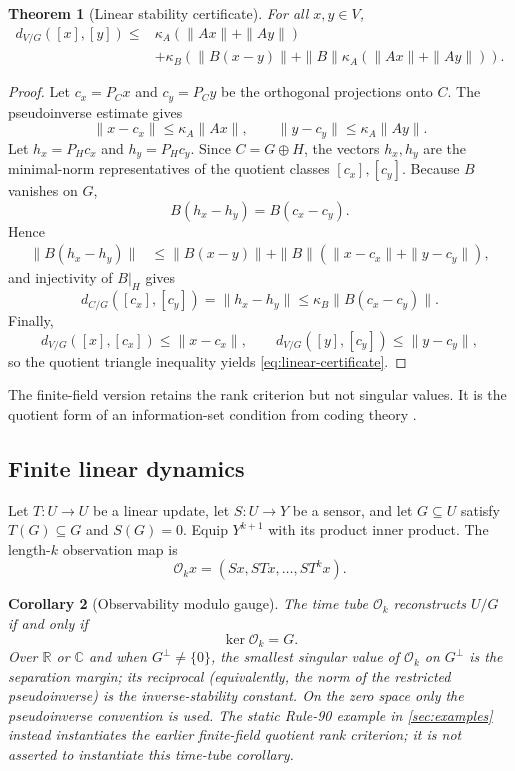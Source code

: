 \documentclass[11pt]{article}
\newtheorem{theorem}{Theorem}[section]
\newtheorem{corollary}[theorem]{Corollary}
\theoremstyle{definition}
\theoremstyle{remark}
\numberwithin{equation}{section}
\begin{document}
\begin{theorem}[Linear stability certificate]\label{thm:linear-certificate}
For all $x,y\in V$,
\begin{equation}\label{eq:linear-certificate}
\begin{split}
 d_{V/G}([x],[y])\le{}&
 \kappa_A(\|Ax\|+\|Ay\|)\\
 &+\kappa_B\!\left(
 \|B(x-y)\|+
 \|B\|\kappa_A(\|Ax\|+\|Ay\|)
 \right).
\end{split}
\end{equation}
\end{theorem}

\begin{proof}
Let $c_x=P_Cx$ and $c_y=P_Cy$ be the orthogonal projections onto $C$.  The pseudoinverse estimate gives
\[
 \|x-c_x\|\le\kappa_A\|Ax\|,
 \qquad
 \|y-c_y\|\le\kappa_A\|Ay\|.
\]
Let $h_x=P_Hc_x$ and $h_y=P_Hc_y$.  Since $C=G\oplus H$, the vectors $h_x,h_y$ are the minimal-norm representatives of the quotient classes $[c_x],[c_y]$.  Because $B$ vanishes on $G$,
\[
 B(h_x-h_y)=B(c_x-c_y).
\]
Hence
\begin{align*}
 \|B(h_x-h_y)\|
 &\le \|B(x-y)\|+\|B\|(\|x-c_x\|+\|y-c_y\|),
\end{align*}
and injectivity of $B|_H$ gives
\[
 d_{C/G}([c_x],[c_y])=\|h_x-h_y\|
 \le\kappa_B\|B(c_x-c_y)\|.
\]
Finally,
\[
 d_{V/G}([x],[c_x])\le\|x-c_x\|,
 \qquad
 d_{V/G}([y],[c_y])\le\|y-c_y\|,
\]
so the quotient triangle inequality yields \eqref{eq:linear-certificate}.
\end{proof}

The finite-field version retains the rank criterion but not singular values.  It is the quotient form of an information-set condition from coding theory \citep{HuffmanPless2003}.

\subsection{Finite linear dynamics}

Let $T:U\to U$ be a linear update, let $S:U\to Y$ be a sensor, and let
$G\subseteq U$ satisfy $T(G)\subseteq G$ and $S(G)=0$.  Equip
$Y^{k+1}$ with its product inner product.  The length-$k$ observation map is
\[
 \mathcal O_kx=(Sx,STx,\ldots,ST^kx).
\]

\begin{corollary}[Observability modulo gauge]\label{cor:observability}
The time tube $\mathcal O_k$ reconstructs $U/G$ if and only if
\[
 \ker\mathcal O_k=G.
\]
Over $\mathbb R$ or $\mathbb C$ and when $G^\perp\ne\{0\}$, the smallest
singular value of $\mathcal O_k$ on $G^\perp$ is the separation margin; its
reciprocal (equivalently, the norm of the restricted pseudoinverse) is the
inverse-stability constant.  On the zero space only the pseudoinverse
convention is used.  The static Rule-90 example
in \cref{sec:examples} instead instantiates the earlier finite-field quotient
rank criterion; it is not asserted to instantiate this time-tube corollary.
\end{corollary}
\end{document}

